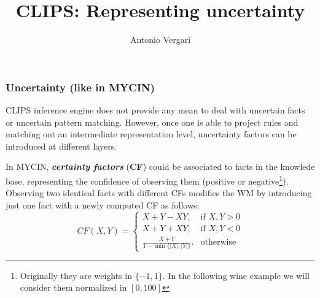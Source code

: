 \documentclass[xcolor={usenames,dvipsnames,svgnames}, compress]{beamer}
\begin{document}
\title{CLIPS: Representing uncertainty}
\author{Antonio Vergari}

\footnotesize \let\small\footnotesize





{
  \begin{frame}
    \titlepage
  \end{frame}
}


\begin{frame}
  \frametitle{Uncertainty (like in MYCIN)}
  CLIPS inference engine does not provide any mean to deal with
  uncertain facts or uncertain pattern matching. However, once one is
  able to project rules and matching ont an intermediate
  representation level, uncertainty factors can be introduced at
  different layers.\par\bigskip

  In \textsf{MYCIN}, \textbf{\emph{certainty factors}} (\textbf{CF})
  could be associated to facts in the knowlede base, representing the
  confidence of observing them (positive or
  negative\footnote{Originally they are weights in $\{-1, 1\}$. In the
  following wine example we will consider them normalized in $[0, 100]$}). Observing two
  identical facts with different CFs modifies the WM by introducing
  just one fact with a newly computed CF as follows:
  $$ CF(X, Y) =
  \begin{cases}
    X + Y - XY,& \text{if } X,Y>0\\
    X + Y + XY,& \text{if } X, Y<0\\
    \frac{X+ Y}{1 - \min\{|X|, |Y|\}}. & \text{otherwise}
  \end{cases}
  $$
  

\end{frame}
\end{document}
